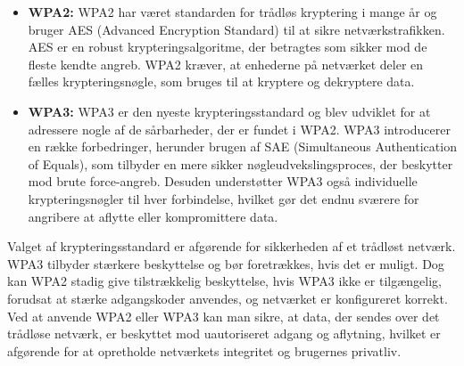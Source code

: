 \begin{itemize}
	\item \textbf{WPA2:} WPA2 har været standarden for trådløs kryptering i mange år og bruger AES (Advanced Encryption Standard) til at sikre netværkstrafikken. AES er en robust krypteringsalgoritme, der betragtes som sikker mod de fleste kendte angreb. WPA2 kræver, at enhederne på netværket deler en fælles krypteringsnøgle, som bruges til at kryptere og dekryptere data.
	
	\item \textbf{WPA3:} WPA3 er den nyeste krypteringsstandard og blev udviklet for at adressere nogle af de sårbarheder, der er fundet i WPA2. WPA3 introducerer en række forbedringer, herunder brugen af SAE (Simultaneous Authentication of Equals), som tilbyder en mere sikker nøgleudvekslingsproces, der beskytter mod brute force-angreb. Desuden understøtter WPA3 også individuelle krypteringsnøgler til hver forbindelse, hvilket gør det endnu sværere for angribere at aflytte eller kompromittere data.
\end{itemize}

Valget af krypteringsstandard er afgørende for sikkerheden af et trådløst netværk. WPA3 tilbyder stærkere beskyttelse og bør foretrækkes, hvis det er muligt. Dog kan WPA2 stadig give tilstrækkelig beskyttelse, hvis WPA3 ikke er tilgængelig, forudsat at stærke adgangskoder anvendes, og netværket er konfigureret korrekt.
\newline\newline\noindent
Ved at anvende WPA2 eller WPA3 kan man sikre, at data, der sendes over det trådløse netværk, er beskyttet mod uautoriseret adgang og aflytning, hvilket er afgørende for at opretholde netværkets integritet og brugernes privatliv.


